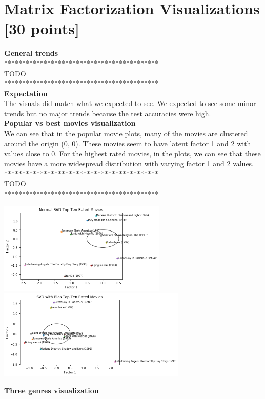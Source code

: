 \section{Matrix Factorization Visualizations [30 points]}
\noindent\textbf{General trends }\\
*******************************************\\
TODO \\
*******************************************\\
\noindent\textbf{Expectation }\\
The visuals did match what we expected to see. We expected to see some minor trends but no major trends because the test accuracies were high.  \\
\noindent\textbf{Popular vs best movies visualization }\\
We can see that in the popular movie plots, many of the movies are clustered around the origin (0, 0). These movies seem to have latent factor 1 and 2 with values close to 0. For the highest rated movies, in the plots, we can see that these movies have a more widespread distribution with varying factor 1 and 2 values. \\
*******************************************\\
TODO \\
*******************************************\\
\begin{center}
	\includegraphics[width=8cm]{Pictures/1_edit1}\includegraphics[width=9cm]{Pictures/2_edit1}
\end{center}
\noindent\textbf{Three genres visualization }\\
